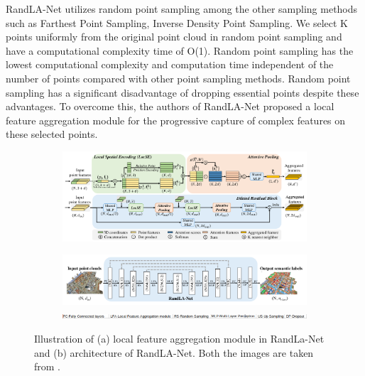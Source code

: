 RandLA-Net utilizes random point sampling among the other sampling methods such as Farthest Point Sampling, Inverse Density Point Sampling.
We select K points uniformly from the original point cloud in random point sampling and have a computational complexity time of O(1).
Random point sampling has the lowest computational complexity and computation time independent of the number of points compared with other point sampling methods.
Random point sampling has a significant disadvantage of dropping essential points despite these advantages.
To overcome this, the authors of RandLA-Net proposed a local feature aggregation module for the progressive capture of complex features on these selected points.
\begin{figure}
    \centering
    \begin{subfigure}{0.45\textwidth}
        \centering
            \includegraphics[scale=0.4, angle=90]{images/localfeatueaggregation-randlanet.png}
            \caption{}
            \label{fig:randlanetlfa}       
    \end{subfigure}
    \begin{subfigure}{0.45\textwidth}
        \centering
            \includegraphics[scale=0.55, angle=90]{images/randlanet.png}
            \includegraphics[scale=0.55, angle=90]{images/archi_expl.png}
            \caption{}
            \label{fig:networkarchitecture}
    \end{subfigure}
    \caption{Illustration of (a) local feature aggregation module in RandLa-Net and (b) architecture of RandLA-Net. Both the images are taken from \cite{Hu_2020_CVPR_Randla}.}
\end{figure}

